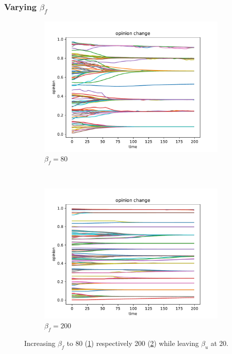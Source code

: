 \documentclass[11pt]{article}
\begin{document}
\subsubsection{Varying $\beta_f$}

\begin{figure}[H]
    \begin{subfigure}[t]{0.5\textwidth}
    \includegraphics[width = \linewidth]{img/bf_high_1.pdf}
    \caption{$\beta_f=80$}\label{sfig:bfhigh1}
    \end{subfigure}
    ~
    \begin{subfigure}[t]{0.5\textwidth}
    \includegraphics[width = \linewidth]{img/bf_high_2.pdf}
    \caption{$\beta_f=200$}\label{sfig:bfhigh2}
    \end{subfigure}
    \caption{Increasing $\beta_f$ to 80 (\ref{sfig:bfhigh1}) respectively 200 (\ref{sfig:bfhigh2}) while leaving $\beta_u$ at 20.}\label{sfig:bfhigh}
\end{figure}
\end{document}
